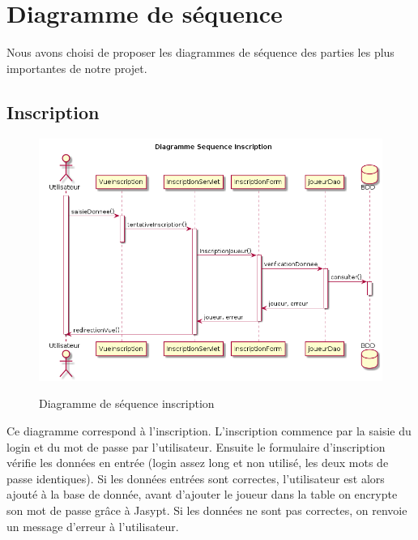 \section{Diagramme de séquence }

Nous avons choisi de proposer les diagrammes de séquence des parties les plus importantes de notre projet. 

\subsection{Inscription}
\begin{figure}[H]
  \center
  \includegraphics[scale=0.25]{../graph/DiagrammeSequenceInscription.png} \\
  \caption{Diagramme de séquence inscription}
\end{figure}

Ce diagramme correspond à l'inscription. L'inscription commence par la saisie du login et du mot de passe par l'utilisateur. Ensuite le formulaire d'inscription vérifie les données en entrée (login assez long et non utilisé, les deux mots de passe identiques). Si les données entrées sont correctes, l'utilisateur est alors ajouté à la base de donnée, avant d'ajouter le joueur dans la table on encrypte son mot de passe grâce à Jasypt. Si les données ne sont pas correctes, on renvoie un message d'erreur à l'utilisateur. 

